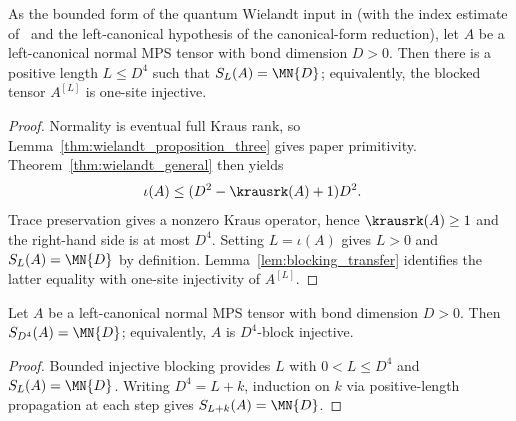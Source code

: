 \begin{lemma}%
    \label{thm:bounded_injective_blocking_normal_left_canonical}
    \leanok
    As the bounded form of the quantum Wielandt input in
    \cite[Section~II]{Cirac2016MPDO_arXiv} (with the index estimate
    of~\cite[Theorem~1]{Sanz2010Quantum} and the left-canonical hypothesis of
    the canonical-form reduction), let $A$ be a left-canonical normal MPS
    tensor with bond dimension $D>0$. Then there is a positive length
    $L\le D^4$ such that $S_L(A)=\MN{D}$; equivalently, the blocked tensor
    $A^{[L]}$ is one-site injective.
\end{lemma}

\begin{proof}
    \leanok
    Normality is eventual full Kraus rank, so
    Lemma~\ref{thm:wielandt_proposition_three} gives paper primitivity.
    Theorem~\ref{thm:wielandt_general} then yields
    \begin{align}
        \iota(A)
         & \le(D^2-\krausrk(A)+1)D^2.
        \notag
    \end{align}
    Trace preservation gives a nonzero Kraus operator, hence
    $\krausrk(A)\ge1$ and the right-hand side is at most $D^4$.
    Setting $L=\iota(A)$ gives $L>0$ and $S_L(A)=\MN{D}$ by definition.
    Lemma~\ref{lem:blocking_transfer} identifies the latter equality with
    one-site injectivity of $A^{[L]}$.
\end{proof}

\begin{theorem}
    \label{thm:exact_pow_four_block_injectivity_normal_left_canonical}
    \leanok
    Let $A$ be a left-canonical normal MPS tensor with bond dimension $D>0$.
    Then $S_{D^4}(A)=\MN{D}$; equivalently, $A$ is
    $D^4$-block injective.
\end{theorem}

\begin{proof}
    \leanok
    Bounded injective blocking provides $L$ with
    $0<L\le D^4$ and $S_L(A)=\MN{D}$. Writing $D^4=L+k$, induction on $k$ via
    positive-length propagation at each step gives $S_{L+k}(A)=\MN{D}$.
\end{proof}

